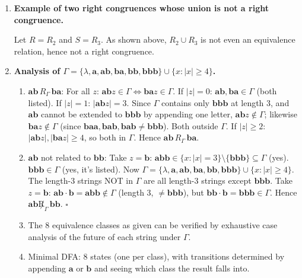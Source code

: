 \begin{enumerate}[{2.}1.]
\item \textbf{Example of two right congruences whose union is not a right congruence.}

Let $R=R_2$ and $S=R_3$. As shown above, $R_2\cup R_3$ is not even an equivalence relation, hence not a right congruence.

\item \textbf{Analysis of $\Gamma=\{\lambda,\mathbf{a},\mathbf{ab},\mathbf{ba},\mathbf{bb},\mathbf{bbb}\}\cup\{x:|x|\geq 4\}$.}

\begin{enumerate}
\item $\mathbf{ab}\,R_\Gamma\,\mathbf{ba}$: For all $z$: $\mathbf{ab}z\in\Gamma\Leftrightarrow\mathbf{ba}z\in\Gamma$. If $|z|=0$: $\mathbf{ab},\mathbf{ba}\in\Gamma$ (both listed). \checkmark If $|z|=1$: $|\mathbf{ab}z|=3$. Since $\Gamma$ contains only $\mathbf{bbb}$ at length 3, and $\mathbf{ab}$ cannot be extended to $\mathbf{bbb}$ by appending one letter, $\mathbf{ab}z\notin\Gamma$; likewise $\mathbf{ba}z\notin\Gamma$ (since $\mathbf{baa},\mathbf{bab},\mathbf{bab}\neq\mathbf{bbb}$). Both outside $\Gamma$. \checkmark If $|z|\geq 2$: $|\mathbf{ab}z|,|\mathbf{ba}z|\geq 4$, so both in $\Gamma$. \checkmark Hence $\mathbf{ab}\,R_\Gamma\,\mathbf{ba}$.

\item $\mathbf{ab}$ not related to $\mathbf{bb}$: Take $z=\mathbf{b}$: $\mathbf{abb}\in\{x:|x|=3\}\setminus\{\mathbf{bbb}\}\subseteq\Gamma$ (yes). $\mathbf{bbb}\in\Gamma$ (yes, it's listed). Now $\Gamma=\{\lambda,\mathbf{a},\mathbf{ab},\mathbf{ba},\mathbf{bb},\mathbf{bbb}\}\cup\{x:|x|\geq 4\}$. The length-3 strings NOT in $\Gamma$ are all length-3 strings except $\mathbf{bbb}$. Take $z=\mathbf{b}$: $\mathbf{ab}\cdot\mathbf{b}=\mathbf{abb}\notin\Gamma$ (length 3, $\neq\mathbf{bbb}$), but $\mathbf{bb}\cdot\mathbf{b}=\mathbf{bbb}\in\Gamma$. Hence $\mathbf{ab}\not R_\Gamma\,\mathbf{bb}$. $\square$

\item The 8 equivalence classes as given can be verified by exhaustive case analysis of the future of each string under $\Gamma$.

\item Minimal DFA: 8 states (one per class), with transitions determined by appending $\mathbf{a}$ or $\mathbf{b}$ and seeing which class the result falls into.
\end{enumerate}


\end{enumerate}
